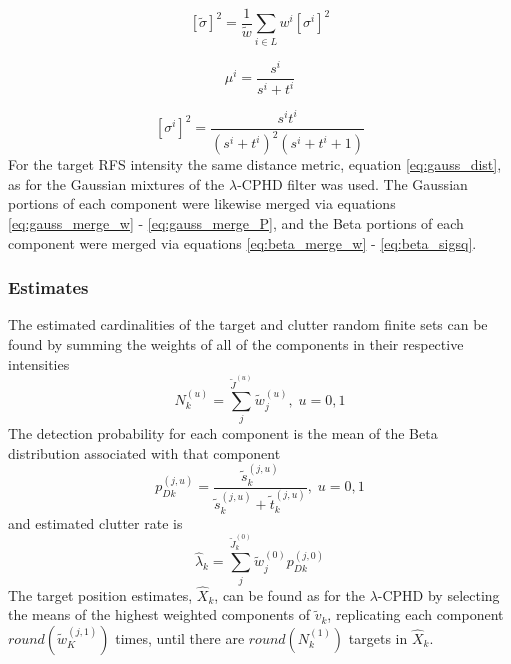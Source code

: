 \documentclass{article}
\newcommand{\clut}{{(0)}}
\newcommand{\tgt}{{(1)}}
\newcommand{\clutj}{{(j,0)}}
\newcommand{\tgtj}{{(j,1)}}
\begin{document}
\begin{equation}
  \label{eq:beta_sigsq_merge}
  \left[ \tilde{\sigma} \right]^2 = \frac{ 1 }{\tilde{w}}\sum_{i \in L}w^i\left[ \sigma^i \right]^2
\end{equation}

\begin{equation}
  \label{eq:beta_mu}
  \mu^i = \frac{s^i}{s^i + t^i}
\end{equation}

\begin{equation}
  \label{eq:beta_sigsq}
  \left[ \sigma^i \right]^2 =
  \frac{ s^i t^i }{ \left( s^i + t^i\right) ^2 \left( s^i + t^i + 1 \right) }
\end{equation}
For the target RFS intensity the same distance metric, equation \eqref{eq:gauss_dist}, as for the Gaussian mixtures of the $\lambda$-CPHD filter was used. The Gaussian portions of each component were likewise merged via equations \eqref{eq:gauss_merge_w} - \eqref{eq:gauss_merge_P}, and the Beta portions of each component were merged via equations \eqref{eq:beta_merge_w} - \eqref{eq:beta_sigsq}.

\subsubsection*{Estimates}
The estimated cardinalities of the target and clutter random finite sets can be found by summing the weights of all of the components in their respective intensities
\begin{equation}
  \label{eq:lpd_N}
  N_k^{(u)} = \sum_j^{\tilde{J}^{(u)}}\tilde{w}^{(u)}_j,\;u=0,1
\end{equation}
The detection probability for each component is the mean of the Beta distribution associated with that component
\begin{equation}
  \label{eq:pdk}
  p_{Dk}^{(j,u)} = \frac{ \tilde{s}_{k}^{(j, u)}}{\tilde{s}_{k}^{(j, u)} + \tilde{t}_{k}^{(j, u)}},\;u=0,1
\end{equation}
and estimated clutter rate is
\begin{equation}
  \label{eq:lpd_lambda_hat}
  \hat{\lambda}_k = \sum_j^{\tilde{J}_k^\clut}\tilde{w}^\clut_jp_{Dk}^\clutj 
\end{equation}
The target position estimates, $\hat{X}_k$, can be found as for the $\lambda$-CPHD by selecting the means of the highest weighted components of $\tilde{v}_k$, replicating each component $round(\tilde{w}_K^\tgtj)$ times, until there are $round(N_k^\tgt)$ targets in $\hat{X}_k$.
\end{document}
